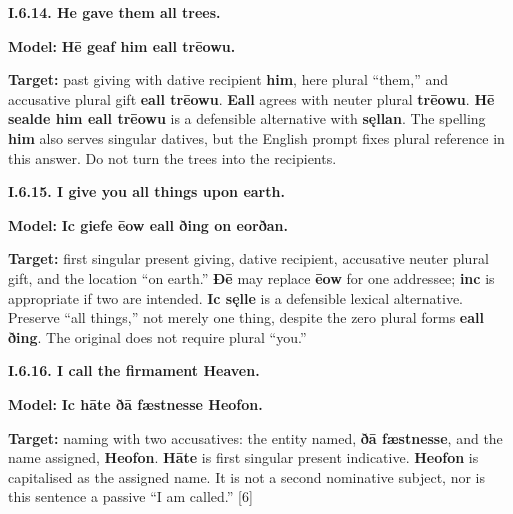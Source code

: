 \par\begin{minipage}{\linewidth}\raggedright
\textbf{I.6.14. He gave them all trees.}

\textbf{Model:} \textbf{Hē geaf him eall trēowu.}

\textbf{Target:} past giving with dative recipient \textbf{him}, here plural “them,” and accusative plural gift \textbf{eall trēowu}. \textbf{Eall} agrees with neuter plural \textbf{trēowu}. \textbf{Hē sealde him eall trēowu} is a defensible alternative with \textbf{sęllan}. The spelling \textbf{him} also serves singular datives, but the English prompt fixes plural reference in this answer. Do not turn the trees into the recipients.

\end{minipage}\par\addvspace{4pt}

\par\begin{minipage}{\linewidth}\raggedright
\textbf{I.6.15. I give you all things upon earth.}

\textbf{Model:} \textbf{Ic giefe ēow eall ðing on eorðan.}

\textbf{Target:} first singular present giving, dative recipient, accusative neuter plural gift, and the location “on earth.” \textbf{Ðē} may replace \textbf{ēow} for one addressee; \textbf{inc} is appropriate if two are intended. \textbf{Ic sęlle} is a defensible lexical alternative. Preserve “all things,” not merely one thing, despite the zero plural forms \textbf{eall ðing}. The original does not require plural “you.”

\end{minipage}\par\addvspace{4pt}

\par\begin{minipage}{\linewidth}\raggedright
\textbf{I.6.16. I call the firmament Heaven.}

\textbf{Model:} \textbf{Ic hāte ðā fæstnesse Heofon.}

\textbf{Target:} naming with two accusatives: the entity named, \textbf{ðā fæstnesse}, and the name assigned, \textbf{Heofon}. \textbf{Hāte} is first singular present indicative. \textbf{Heofon} is capitalised as the assigned name. It is not a second nominative subject, nor is this sentence a passive “I am called.” [6]

\end{minipage}\par\addvspace{4pt}

